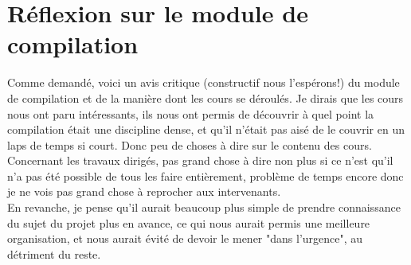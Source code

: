 \section{Réflexion sur le module de compilation}

Comme demandé, voici un avis critique (constructif nous l'espérons!) du module de compilation et de la manière dont les cours se déroulés.
Je dirais que les cours nous ont paru intéressants, ils nous ont permis de découvrir à quel point la compilation était une discipline dense, et qu'il n'était pas aisé de le couvrir en un laps de temps si court. Donc peu de choses à dire sur le contenu des cours.\\
Concernant les travaux dirigés, pas grand chose à dire non plus si ce n'est qu'il n'a pas été possible de tous les faire entièrement, problème de temps encore donc je ne vois pas grand chose à reprocher aux intervenants.\\
En revanche, je pense qu'il aurait beaucoup plus simple de prendre connaissance du sujet du projet plus en avance, ce qui nous aurait permis une meilleure organisation, et nous aurait évité de devoir le mener "dans l'urgence", au détriment du reste. 	
